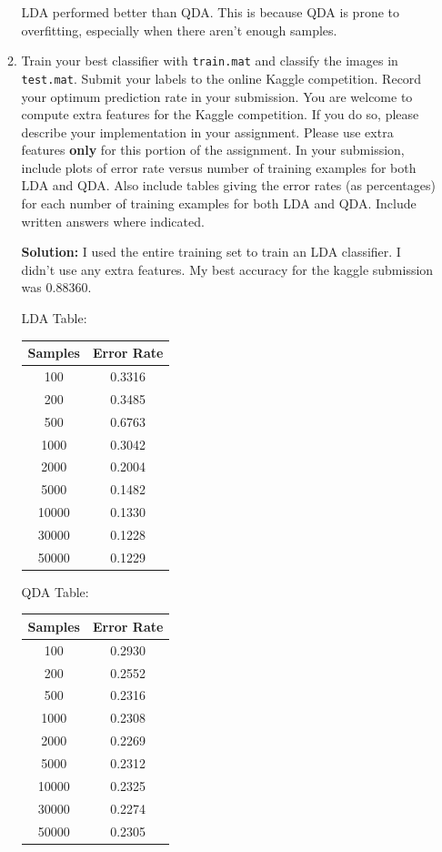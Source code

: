 \documentclass{article}
\newcommand{\solution}{\textbf{Solution: }}
\begin{document}
\begin{enumerate}[label=(\alph*)]
\begin{enumerate}[label=(\roman*)]
\begin{mdframed}
        LDA performed better than QDA. This is because QDA is prone to overfitting, especially when there aren't enough samples.
        
        \end{mdframed}
        
        \item Train your best classifier with \texttt{train.mat} and classify the images in \texttt{test.mat}. Submit your labels to the online Kaggle competition. Record your optimum prediction rate in your submission. You are welcome to compute extra features for the Kaggle competition. If you do so, please describe your implementation in your assignment. Please use extra features \textbf{only} for this portion of the assignment. In your submission, include plots of error rate versus number of training examples for both LDA and QDA. Also include tables giving the error rates (as percentages) for each number of training examples for both LDA and QDA. Include written answers where indicated.
        \begin{mdframed} \solution
        I used the entire training set to train an LDA classifier. I didn't use any extra features. My best accuracy for the kaggle submission was 0.88360.
        \begin{center}
        LDA Table:
        \begin{tabular}{|c c|}
        \hline
        Samples & Error Rate\\
        \hline
        100 & 0.3316\\
        200 & 0.3485\\
        500 & 0.6763\\
        1000 & 0.3042\\
        2000 & 0.2004\\
        5000 & 0.1482\\
        10000 & 0.1330\\
        30000 & 0.1228\\
        50000 & 0.1229\\
        \hline
        \end{tabular}
        \quad QDA Table:
        \begin{tabular}{|c c|}
        \hline
        Samples & Error Rate\\
        \hline
        100 & 0.2930\\
        200 & 0.2552\\
        500 & 0.2316\\
        1000 & 0.2308\\
        2000 & 0.2269\\
        5000 & 0.2312\\
        10000 & 0.2325\\
        30000 & 0.2274\\
        50000 & 0.2305\\
        \hline
        \end{tabular}
        \end{center}
        \end{mdframed}
    

\end{enumerate}
\end{enumerate}
\end{document}
